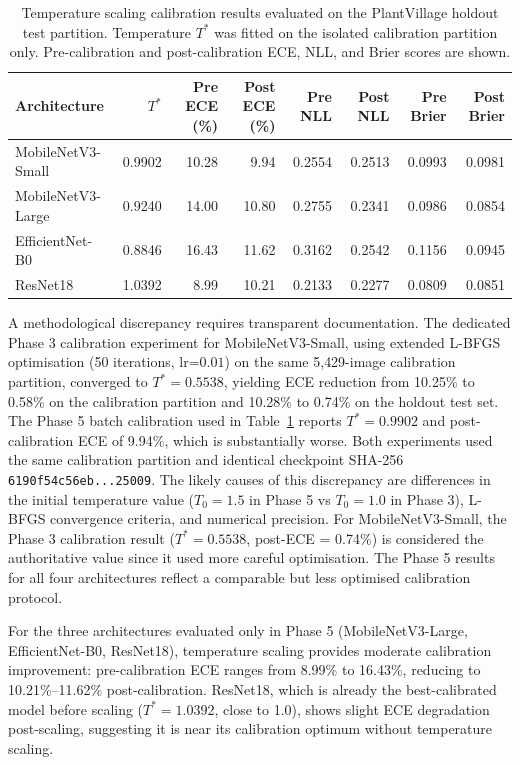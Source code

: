 \documentclass[pdflatex,sn-mathphys-num]{sn-jnl}
\begin{document}
\begin{table}[H]
\caption{Temperature scaling calibration results evaluated on the PlantVillage holdout
test partition. Temperature $T^*$ was fitted on the isolated calibration partition only.
Pre-calibration and post-calibration ECE, NLL, and Brier scores are shown.}
\label{tab:calibration_results}
\centering
\begin{tabular}{lrrrrrrr}
\toprule
\textbf{Architecture} & $T^*$ &
\textbf{Pre ECE (\%)} & \textbf{Post ECE (\%)} &
\textbf{Pre NLL} & \textbf{Post NLL} &
\textbf{Pre Brier} & \textbf{Post Brier} \\
\midrule
MobileNetV3-Small  & 0.9902 & 10.28 &  9.94 & 0.2554 & 0.2513 & 0.0993 & 0.0981 \\
MobileNetV3-Large  & 0.9240 & 14.00 & 10.80 & 0.2755 & 0.2341 & 0.0986 & 0.0854 \\
EfficientNet-B0    & 0.8846 & 16.43 & 11.62 & 0.3162 & 0.2542 & 0.1156 & 0.0945 \\
ResNet18           & 1.0392 &  8.99 & 10.21 & 0.2133 & 0.2277 & 0.0809 & 0.0851 \\
\bottomrule
\end{tabular}
\end{table}

A methodological discrepancy requires transparent documentation. The dedicated Phase 3
calibration experiment for MobileNetV3-Small, using extended L-BFGS optimisation (50
iterations, lr=$0.01$) on the same 5{,}429-image calibration partition, converged to
$T^* = 0.5538$, yielding ECE reduction from 10.25\% to 0.58\% on the calibration
partition and 10.28\% to 0.74\% on the holdout test set. The Phase 5 batch calibration
used in Table~\ref{tab:calibration_results} reports $T^* = 0.9902$ and post-calibration
ECE of 9.94\%, which is substantially worse. Both experiments used the same
calibration partition and identical checkpoint SHA-256
\texttt{6190f54c56eb...25009}. The likely causes of this discrepancy are differences
in the initial temperature value ($T_0 = 1.5$ in Phase 5 vs $T_0 = 1.0$ in Phase 3),
L-BFGS convergence criteria, and numerical precision. For MobileNetV3-Small, the
Phase 3 calibration result ($T^* = 0.5538$, post-ECE = 0.74\%) is considered the
authoritative value since it used more careful optimisation. The Phase 5 results for
all four architectures reflect a comparable but less optimised calibration protocol.

For the three architectures evaluated only in Phase 5 (MobileNetV3-Large, EfficientNet-B0,
ResNet18), temperature scaling provides moderate calibration improvement: pre-calibration
ECE ranges from 8.99\% to 16.43\%, reducing to 10.21\%--11.62\% post-calibration.
ResNet18, which is already the best-calibrated model before scaling ($T^* = 1.0392$,
close to 1.0), shows slight ECE degradation post-scaling, suggesting it is near its
calibration optimum without temperature scaling.
\end{document}
